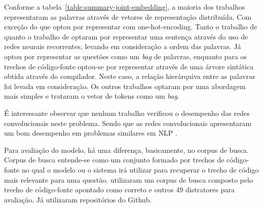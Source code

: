 Conforme a tabela~\ref{table:summary-joint-embedding}, a maioria dos trabalhos representaram as palavras através de vetores de representação distribuída. Com exceção do \cite{iyer-etal-2016-summarizing} que optou por representar com \gls{one-hot-encoding}. Tanto o trabalho de \cite{Gu-deep-code-search:2018} quanto o trabalho de \cite{iyer-etal-2016-summarizing} optaram por representar uma sentença através do uso de redes neurais recorrentes, levando em consideração a ordem das palavras. Já \cite{Allamanis-bimodal-source-code-natural-language:2015} optou por representar as questões como um \textit{bag} de palavras, enquanto para os trechos de código-fonte optou-se por representar através de uma árvore sintática obtida através do compilador. Neste caso, a relação hierárquiva entre as palavras foi levada em consideração. Os outros trabalhos \cite{Chen-bi-variational-autoencoder:2018, Sachdev-neural-code-search:2018, cambronero-deep-learning-code-search:2019} optaram por uma abordagem mais simples e trataram o vetor de tokens como um \textit{bag}.

É interessante observar que nenhum trabalho verificou o desempenho das redes convolucionais neste problema. Sendo que as redes convolucionais apresentaram um bom desempenho em problemas similares em NLP .

Para avaliação do modelo, há uma diferença, basicamente, no corpus de busca. Corpus de busca entende-se como um conjunto formado por trechos de código-fonte no qual o modelo ou o sistema irá utilizar para recuperar o trecho de código mais relevante para uma questão. \cite{iyer-etal-2016-summarizing, Chen-bi-variational-autoencoder:2018} utilizaram um corpus de busca composto pelo trecho de código-fonte apontado como correto e outros 49 distratores para avaliação. Já \cite{Gu-deep-code-search:2018, Sachdev-neural-code-search:2018, cambronero-deep-learning-code-search:2019} utilizaram repositórios do Github.  

